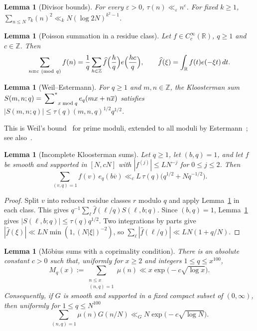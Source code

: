\documentclass[11pt]{amsart}
\newtheorem{lemma}[theorem]{Lemma}
\theoremstyle{definition}
\theoremstyle{remark}
\numberwithin{equation}{section}
\newcommand{\Z}{\mathbb Z}
\newcommand{\R}{\mathbb R}
\newcommand{\eps}{\varepsilon}
\newcommand{\inv}[1]{\overline{#1}}
\newcommand{\sumstar}{\sideset{}{^*}\sum}
\begin{document}
\begin{lemma}[Divisor bounds]\label{lem:divisor}
For every $\eps>0$, $\tau(n)\ll_\eps n^\eps$.  For fixed $k\ge1$,
$\sum_{n\le N}\tau_k(n)^2\ll_k N(\log 2N)^{k^2-1}$.
\end{lemma}

\begin{lemma}[Poisson summation in a residue class]\label{lem:poisson}
Let $f\in C_c^\infty(\R)$, $q\ge1$ and $c\in\Z$.  Then
\[
 \sum_{n\equiv c\ (\mathrm{mod}\ q)}f(n)
 =\frac1q\sum_{h\in\Z}\widehat f\Bigl(\frac hq\Bigr)e\Bigl(\frac{hc}{q}\Bigr),
 \qquad \widehat f(\xi)=\int_\R f(t)e(-\xi t)\,dt .
\]
\end{lemma}

\begin{lemma}[Weil--Estermann]\label{lem:weil}
For $q\ge1$ and $m,n\in\Z$, the Kloosterman sum
$S(m,n;q)=\sumstar_{x\bmod q}e_q(mx+n\inv x)$ satisfies
$|S(m,n;q)|\le\tau(q)(m,n,q)^{1/2}q^{1/2}$.
\end{lemma}

This is Weil's bound~\cite{Weil} for prime moduli, extended to all moduli
by Estermann~\cite{Est}; see also~\cite[Ch.~11]{IK}.

\begin{lemma}[Incomplete Kloosterman sums]\label{lem:incomplete}
Let $q\ge1$, let $(b,q)=1$, and let $f$ be smooth and supported in
$[N,cN]$ with $|f^{(j)}|\le L N^{-j}$ for $0\le j\le2$.  Then
\[
 \sum_{(v,q)=1}f(v)\,e_q(b\inv v)\ll_c L\,\tau(q)\bigl(q^{1/2}+Nq^{-1/2}\bigr).
\]
\end{lemma}

\begin{proof}
Split $v$ into reduced residue classes $r$ modulo $q$ and apply
Lemma~\ref{lem:poisson} in each class.  This gives
$q^{-1}\sum_{\ell}\widehat f(\ell/q)S(\ell,b;q)$.  Since $(b,q)=1$,
Lemma~\ref{lem:weil} gives $|S(\ell,b;q)|\le\tau(q)q^{1/2}$.  Two
integrations by parts give
$|\widehat f(\xi)|\ll LN\min(1,(N|\xi|)^{-2})$, so
$\sum_\ell|\widehat f(\ell/q)|\ll LN(1+q/N)$.
\end{proof}

\begin{lemma}[M\"obius sums with a coprimality condition]\label{lem:mobius}
There is an absolute constant $c>0$ such that, uniformly for $x\ge2$ and
integers $1\le q\le x^{100}$,
\[
 M_q(x):=\sum_{\substack{n\le x\\(n,q)=1}}\mu(n)\ll x\exp\bigl(-c\sqrt{\log x}\bigr).
\]
Consequently, if $G$ is smooth and supported in a fixed compact subset of
$(0,\infty)$, then uniformly for $1\le q\le N^{100}$
\[
 \sum_{(n,q)=1}\mu(n)G(n/N)\ll_G N\exp\bigl(-c\sqrt{\log N}\bigr).
\]
\end{lemma}
\end{document}
